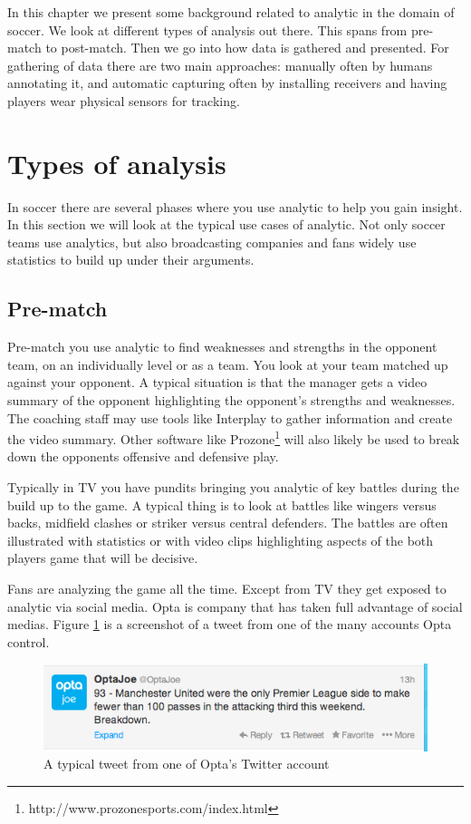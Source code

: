 In this chapter we present some background related to analytic in the domain of soccer. We look at different types of analysis out there. This spans from pre-match to post-match. Then we go into how data is gathered and presented. For gathering of data there are two main approaches: manually often by humans annotating it, and automatic capturing often by installing receivers and having players wear physical sensors for tracking.

\section{Types of analysis}

In soccer there are several phases where you use analytic to help you gain insight. In this section we will look at the typical use cases of analytic. Not only soccer teams use analytics, but also broadcasting companies and fans widely use statistics to build up under their arguments.

\subsection{Pre-match}

Pre-match you use analytic to find weaknesses and strengths in the opponent team, on an individually level or as a team. You look at your team matched up against your opponent. A typical situation is that the manager gets a video summary of the opponent highlighting the opponent’s strengths and weaknesses. The coaching staff may use tools like Interplay to gather information and create the video summary. Other software like Prozone\footnote{http://www.prozonesports.com/index.html} will also likely be used to break down the opponents offensive and defensive play. 

Typically in TV you have pundits bringing you analytic of key battles during the build up to the game. A typical thing is to look at battles like wingers versus backs, midfield clashes or striker versus central defenders. The battles are often illustrated with statistics or with video clips highlighting aspects of the both players game that will be decisive. 

Fans are analyzing the game all the time. Except from TV they get exposed to analytic via social media. Opta is company that has taken full advantage of social medias. Figure \ref{fig:optastats} is a screenshot of a tweet from one of the many accounts Opta control. 

\begin{figure}[ht!]
\centering
\includegraphics[width=1\textwidth]{images/general/optastats.png}
\caption{A typical tweet from one of Opta's Twitter account}
\label{fig:optastats}
\end{figure}

